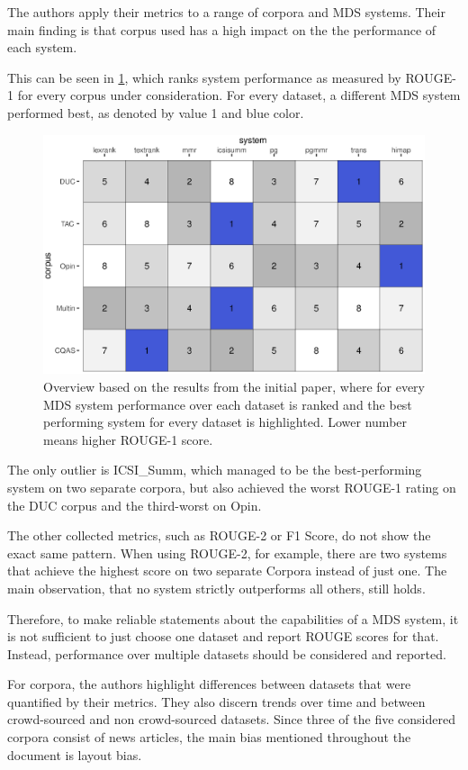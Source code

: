 \documentclass[20_original-paper.tex]{subfiles}
\begin{document}
The authors apply their metrics to a range of corpora and MDS systems. Their main finding is that corpus used has a high impact on the the performance of each system.

This can be seen in \ref{results}, which ranks system performance as measured by ROUGE-1 for every corpus under consideration. For every dataset, a different MDS system performed best, as denoted by value 1 and blue color.




\begin{figure}
    \includegraphics[width=\textwidth]{figures/results.eps}
    \caption{Overview based on the results from the initial paper, where for every MDS system performance over each dataset is ranked and the best performing system for every dataset is highlighted. Lower number means higher ROUGE-1 score.} \label{results}
\end{figure}


The only outlier is ICSI\_Summ, which managed to be the best-performing system on two separate corpora, but also achieved the worst ROUGE-1 rating on the DUC corpus and the third-worst on Opin.


The other collected metrics, such as ROUGE-2 or F1 Score, do not show the exact same pattern.
When using ROUGE-2, for example, there are two systems that achieve the highest score on two separate Corpora instead of just one.
The main observation, that no system strictly outperforms all others, still holds.

Therefore, to make reliable statements about the capabilities of a MDS system,
it is not sufficient to just choose one dataset and report ROUGE scores for that.
Instead, performance over multiple datasets should be considered and reported.

For corpora, the authors highlight differences between datasets that were quantified by their metrics.
They also discern trends over time and between crowd-sourced and non crowd-sourced datasets.
Since three of the five considered corpora consist of news articles, the main bias mentioned throughout the document is layout bias.
\end{document}
